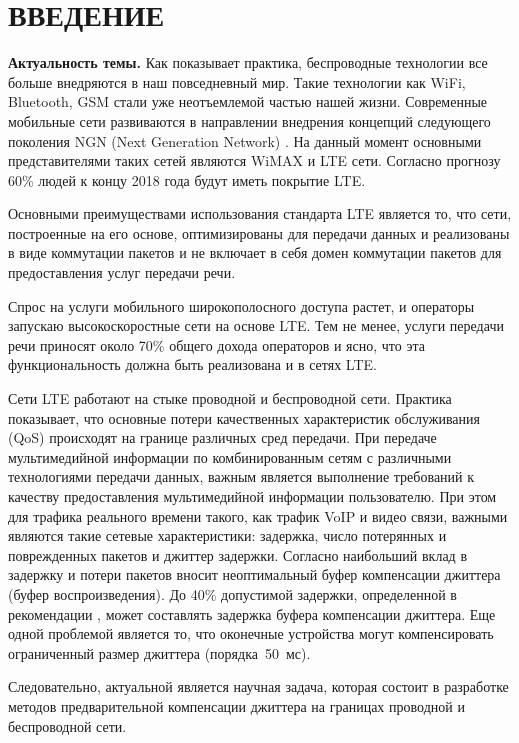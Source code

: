\chapter*{ВВЕДЕНИЕ}							%

\textbf{Актуальность темы.} Как показывает практика, беспроводные технологии все больше внедряются в наш повседневный мир. Такие технологии как WiFi, Bluetooth, GSM стали уже неотъемлемой частью нашей жизни. 
Современные мобильные сети развиваются в направлении внедрения концепций следующего поколения NGN (Next Generation Network) \cite{zacon:net,zacon:tele}. На данный момент основными представителями таких сетей являются WiMAX и LTE сети.
Согласно прогнозу \cite{ericsson} 60\% людей к концу 2018 года будут иметь покрытие LTE.


Основными преимуществами использования стандарта LTE является то, что сети, построенные на его основе, оптимизированы для передачи данных и реализованы в виде коммутации пакетов 
и не включает в себя домен коммутации пакетов для предоставления услуг передачи речи.

Спрос на услуги мобильного широкополосного доступа растет, и операторы запускаю высокоскоростные сети на основе LTE. 
Тем не менее, услуги передачи речи приносят около 70\% общего дохода операторов и ясно, что эта функциональность должна быть реализована и в сетях LTE.

Сети LTE работают на стыке проводной и беспроводной сети. %
Практика показывает, что основные потери качественных характеристик обслуживания (QoS) происходят на границе различных сред передачи.
При передаче мультимедийной информации по комбинированным сетям с различными технологиями передачи данных, важным является выполнение требований к качеству предоставления мультимедийной информации пользователю.
При этом для трафика реального времени такого, как трафик VoIP и видео связи, важными являются такие сетевые характеристики:
задержка, число потерянных и поврежденных пакетов и джиттер задержки.
Согласно \cite{rokovoy} наибольший вклад в задержку и потери пакетов вносит неоптимальный буфер компенсации джиттера (буфер воспроизведения). До 40\% допустимой задержки, определенной в рекомендации \cite{G114}, может составлять задержка буфера компенсации джиттера.
Еще одной проблемой является то, что оконечные устройства могут компенсировать ограниченный размер джиттера (порядка~50~мс).

Следовательно, актуальной является научная задача, которая состоит в разработке методов предварительной компенсации джиттера на границах проводной и беспроводной сети.


